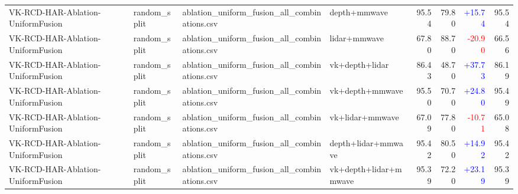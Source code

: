 \documentclass[10pt]{article}
\begin{document}
\begin{longtable}{llllrrrr}
VK-RCD-HAR-Ablation-UniformFusion & random\_split & ablation\_uniform\_fusion\_all\_combinations.csv & depth+mmwave & 95.54 & 79.80 & \textcolor{blue}{+15.74} & 95.54\\
VK-RCD-HAR-Ablation-UniformFusion & random\_split & ablation\_uniform\_fusion\_all\_combinations.csv & lidar+mmwave & 67.80 & 88.70 & \textcolor{red}{-20.90} & 66.56\\
VK-RCD-HAR-Ablation-UniformFusion & random\_split & ablation\_uniform\_fusion\_all\_combinations.csv & vk+depth+lidar & 86.43 & 48.70 & \textcolor{blue}{+37.73} & 86.19\\
VK-RCD-HAR-Ablation-UniformFusion & random\_split & ablation\_uniform\_fusion\_all\_combinations.csv & vk+depth+mmwave & 95.50 & 70.70 & \textcolor{blue}{+24.80} & 95.49\\
VK-RCD-HAR-Ablation-UniformFusion & random\_split & ablation\_uniform\_fusion\_all\_combinations.csv & vk+lidar+mmwave & 67.09 & 77.80 & \textcolor{red}{-10.71} & 65.08\\
VK-RCD-HAR-Ablation-UniformFusion & random\_split & ablation\_uniform\_fusion\_all\_combinations.csv & depth+lidar+mmwave & 95.42 & 80.50 & \textcolor{blue}{+14.92} & 95.42\\
VK-RCD-HAR-Ablation-UniformFusion & random\_split & ablation\_uniform\_fusion\_all\_combinations.csv & vk+depth+lidar+mmwave & 95.39 & 72.20 & \textcolor{blue}{+23.19} & 95.39\\
\bottomrule
\end{longtable}
\end{document}
